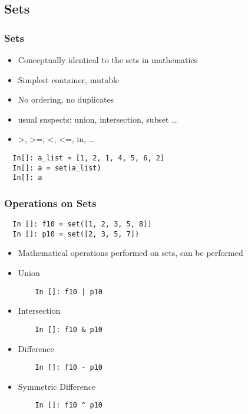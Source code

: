 \documentclass[14pt,compress]{beamer}
\begin{document}
\subsection{Sets}
\begin{frame}[fragile]
  \frametitle{Sets}
  \begin{itemize}
  \item Conceptually identical to the sets in mathematics
  \item Simplest container, mutable
  \item No ordering, no duplicates
  \item usual suspects: union, intersection, subset \ldots
  \item >, >=, <, <=, in, \ldots
  \end{itemize}
  \begin{lstlisting}
  In[]: a_list = [1, 2, 1, 4, 5, 6, 2]
  In[]: a = set(a_list)
  In[]: a
  \end{lstlisting}
\end{frame}

\begin{frame}[fragile]
  \frametitle{Operations on Sets}
  \begin{lstlisting}
  In []: f10 = set([1, 2, 3, 5, 8])
  In []: p10 = set([2, 3, 5, 7])
  \end{lstlisting}
  \begin{itemize}
  \item Mathematical operations performed on sets, can be performed
  \end{itemize}
  \begin{itemize}
  \item Union
    \begin{lstlisting}
    In []: f10 | p10
    \end{lstlisting}
  \item Intersection
    \begin{lstlisting}
    In []: f10 & p10
    \end{lstlisting}
  \item Difference
    \begin{lstlisting}
    In []: f10 - p10
    \end{lstlisting}
  \item Symmetric Difference
\begin{lstlisting}
    In []: f10 ^ p10
    \end{lstlisting}
  \end{itemize}
\end{frame}
\end{document}
